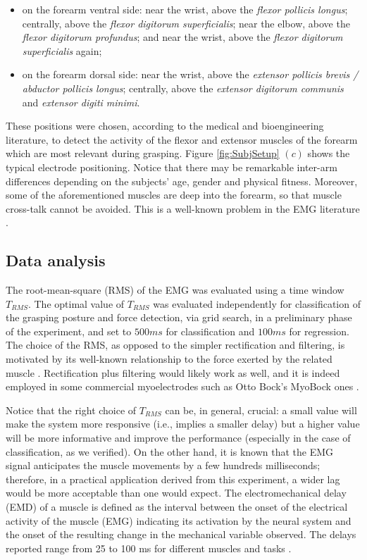 \documentclass[10pt]{bmc_article}
\newenvironment{bmcformat}
  {\begin{raggedright}\baselineskip20pt\sloppy\setboolean{publ}{false}}
  {\end{raggedright}\baselineskip20pt\sloppy}
\begin{document}
\begin{bmcformat}
\begin{itemize}
  \item on the forearm ventral side: near the wrist, above the
    \emph{flexor pollicis longus}; centrally, above the \emph{flexor
    digitorum superficialis}; near the elbow, above the \emph{flexor
    digitorum profundus}; and near the wrist, above the \emph{flexor
    digitorum superficialis} again;

  \item on the forearm dorsal side: near the wrist, above the
    \emph{extensor pollicis brevis / abductor pollicis longus};
    centrally, above the \emph{extensor digitorum communis} and
    \emph{extensor digiti minimi}.

\end{itemize}

These positions were chosen, according to the medical \cite{Kendall} and
bioengineering \cite{kampas} literature, to detect the activity of the flexor
and extensor muscles of the forearm which are most relevant during grasping.
Figure \ref{fig:SubjSetup} $(c)$ shows
the typical electrode positioning. Notice that there may be remarkable
inter-arm differences depending on the subjects' age, gender and physical
fitness. Moreover, some of the aforementioned muscles are deep into
the forearm, so that muscle cross-talk cannot be avoided. This is a
well-known problem in the EMG literature \cite{deluca97,zecca}.

\subsection*{Data analysis}

The root-mean-square (RMS) of the EMG was evaluated using a time window
$T_{RMS}$. The optimal value
of $T_{RMS}$ was evaluated independently for classification of the grasping
posture and force detection, via grid search, in a preliminary phase of the
experiment, and set to $500ms$ for classification and $100ms$ for regression.
The choice of the RMS, as opposed
to the simpler rectification and filtering,
is motivated by its well-known relationship to the force exerted
by the related muscle \cite{deluca97,deluca02,zecca}. Rectification plus filtering
would likely work as well, and it is indeed employed in some commercial myoelectrodes
such as Otto Bock's MyoBock ones \cite{ottobock}.

Notice that the right choice of $T_{RMS}$ can be, in general,
crucial: a small value will make the system more responsive (i.e., implies
a smaller delay) but a higher value will be more informative and improve the
performance (especially in the case of classification, as we verified).
On the other hand, it is known that the EMG signal anticipates the muscle
movements by a few hundreds milliseconds; therefore, in a practical application derived from this
experiment, a wider lag would be more acceptable than one would expect.
The electromechanical delay (EMD) of a muscle is defined as the interval
between the onset of the electrical activity of the muscle (EMG)
indicating its activation by the neural system and the onset of the
resulting change in the mechanical variable observed. The delays
reported range from 25 to 100 ms for different muscles and tasks
\cite{Wolf1994}.


\end{bmcformat}
\end{document}
